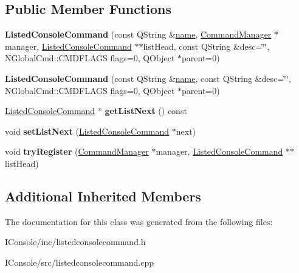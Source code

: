 \subsection*{Public Member Functions}
\begin{DoxyCompactItemize}
\item 
\hypertarget{class_listed_console_command_acbc2c1e24ef3fffd8d8f2b7d12b5b309}{{\bfseries Listed\-Console\-Command} (const Q\-String \&\hyperlink{class_base_console_command_a2f21764f46a3864a362eae2e3396e363}{name}, \hyperlink{class_command_manager}{Command\-Manager} $\ast$manager, \hyperlink{class_listed_console_command}{Listed\-Console\-Command} $\ast$$\ast$list\-Head, const Q\-String \&desc=\char`\"{}\char`\"{}, N\-Global\-Cmd\-::\-C\-M\-D\-F\-L\-A\-G\-S flags=0, Q\-Object $\ast$parent=0)}\label{class_listed_console_command_acbc2c1e24ef3fffd8d8f2b7d12b5b309}

\item 
\hypertarget{class_listed_console_command_a689a422172ced5156ba2b34ff1c2a800}{{\bfseries Listed\-Console\-Command} (const Q\-String \&\hyperlink{class_base_console_command_a2f21764f46a3864a362eae2e3396e363}{name}, const Q\-String \&desc=\char`\"{}\char`\"{}, N\-Global\-Cmd\-::\-C\-M\-D\-F\-L\-A\-G\-S flags=0, Q\-Object $\ast$parent=0)}\label{class_listed_console_command_a689a422172ced5156ba2b34ff1c2a800}

\item 
\hypertarget{class_listed_console_command_a84c311e9f2a70e9672b63f1da43ee0d2}{\hyperlink{class_listed_console_command}{Listed\-Console\-Command} $\ast$ {\bfseries get\-List\-Next} () const }\label{class_listed_console_command_a84c311e9f2a70e9672b63f1da43ee0d2}

\item 
\hypertarget{class_listed_console_command_ab14e1f1af33cef14d5a3b450ef44a31d}{void {\bfseries set\-List\-Next} (\hyperlink{class_listed_console_command}{Listed\-Console\-Command} $\ast$next)}\label{class_listed_console_command_ab14e1f1af33cef14d5a3b450ef44a31d}

\item 
\hypertarget{class_listed_console_command_a93828e08528c3a63811520369ea391db}{void {\bfseries try\-Register} (\hyperlink{class_command_manager}{Command\-Manager} $\ast$manager, \hyperlink{class_listed_console_command}{Listed\-Console\-Command} $\ast$$\ast$list\-Head)}\label{class_listed_console_command_a93828e08528c3a63811520369ea391db}

\end{DoxyCompactItemize}
\subsection*{Additional Inherited Members}


The documentation for this class was generated from the following files\-:\begin{DoxyCompactItemize}
\item 
I\-Console/inc/listedconsolecommand.\-h\item 
I\-Console/src/listedconsolecommand.\-cpp\end{DoxyCompactItemize}

